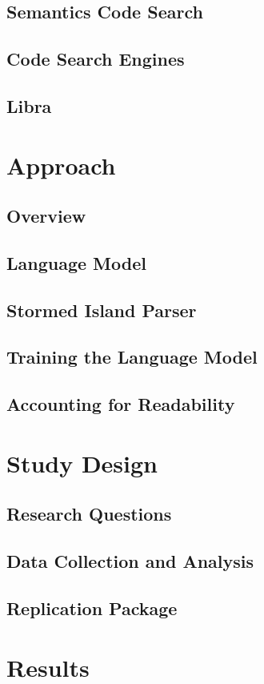 \documentclass[mscthesis,20pt]{usiinfthesis}
\begin{document}
	\section{Semantics Code Search}
	\section{Code Search Engines}
	\section{Libra}

\chapter{Approach}
	\section{Overview}
	\section{Language Model}
	\section{Stormed Island Parser}
	\section{Training the Language Model}
	\section{Accounting for Readability}

\chapter{Study Design}
	\section{Research Questions}
	\section{Data Collection and Analysis}	
	\section{Replication Package}

\chapter{Results}
\end{document}
